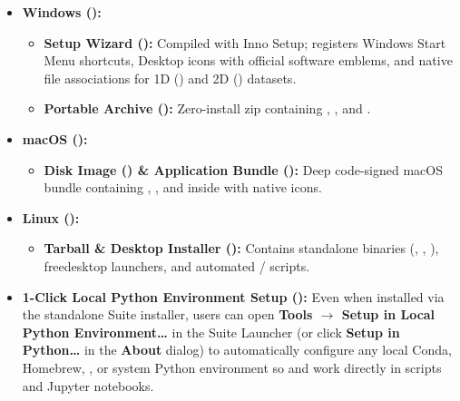 \begin{itemize}
  \item \textbf{Windows ():}
    \begin{itemize}
      \item \textbf{Setup Wizard ():} Compiled with Inno Setup; registers Windows Start Menu shortcuts, Desktop icons with official software emblems, and native file associations for 1D () and 2D () datasets.
      \item \textbf{Portable Archive ():} Zero-install zip containing , , and .
    \end{itemize}
  \item \textbf{macOS ():}
    \begin{itemize}
      \item \textbf{Disk Image () \& Application Bundle ():} Deep code-signed macOS bundle containing , , and  inside  with native  icons.
    \end{itemize}
  \item \textbf{Linux ():}
    \begin{itemize}
      \item \textbf{Tarball \& Desktop Installer ():} Contains standalone binaries (, , ), freedesktop  launchers, and automated  /  scripts.
    \end{itemize}
  \item \textbf{1-Click Local Python Environment Setup ():} Even when installed via the standalone Suite installer, users can open \textbf{Tools $\to$ Setup in Local Python Environment\ldots} in the Suite Launcher (or click \textbf{Setup in Python\ldots} in the \textbf{About} dialog) to automatically configure any local Conda, Homebrew, , or system Python environment so  and  work directly in scripts and Jupyter notebooks.
\end{itemize}

